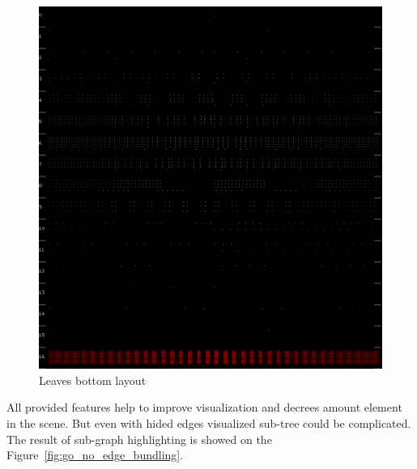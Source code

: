 \begin{figure}[h!]
\centering
\includegraphics[scale=0.3]{pictures/go_leaves_bottom_layout.png}
\caption{Leaves bottom layout}
\label{fig:go_leaves_bottom_layout}
\end{figure}

All provided features help to improve visualization and decrees amount element in the scene. But even with hided edges visualized sub-tree could be complicated. The result of sub-graph highlighting is showed on the Figure~\ref{fig:go_no_edge_bundling}.

